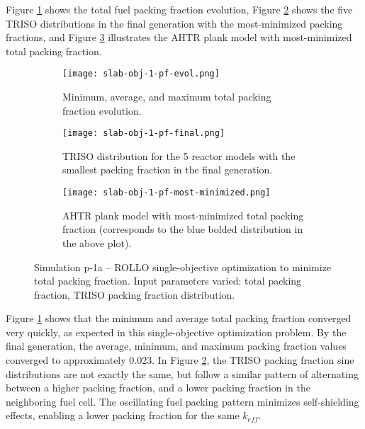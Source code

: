 Figure \ref{fig:slab-obj-1-pf-evol} shows the total fuel packing fraction evolution,  
Figure \ref{fig:slab-obj-1-pf-final} shows the five TRISO distributions in 
the final generation with the most-minimized packing fractions, and 
Figure \ref{fig:slab-obj-1-pf-most-minimized} illustrates the \gls{AHTR} plank model 
with most-minimized total packing fraction.
\begin{figure}[htbp!]
    \centering
    \begin{subfigure}{0.95\textwidth}
        \texttt{[image: slab-obj-1-pf-evol.png]}
        \caption{Minimum, average, and maximum total packing fraction evolution.}
        \label{fig:slab-obj-1-pf-evol} 
    \end{subfigure}
    \begin{subfigure}{0.95\textwidth}
        \texttt{[image: slab-obj-1-pf-final.png]}
        \caption{TRISO distribution for the 5 reactor models with the 
        smallest packing fraction in the final generation.}
        \label{fig:slab-obj-1-pf-final} 
    \end{subfigure}
    \begin{subfigure}{0.95\textwidth}
        \texttt{[image: slab-obj-1-pf-most-minimized.png]}
        \caption{\gls{AHTR} plank model with most-minimized total packing fraction 
        (corresponds to the blue bolded distribution in the above plot).}
        \label{fig:slab-obj-1-pf-most-minimized} 
    \end{subfigure}
    \caption{Simulation p-1a -- ROLLO single-objective optimization to minimize total 
    packing fraction. Input parameters varied: total packing fraction, \gls{TRISO} 
    packing fraction distribution.}
    \label{fig:slab-obj-1-pf}
\end{figure}

Figure \ref{fig:slab-obj-1-pf-evol} shows that the minimum and average total packing 
fraction converged very quickly, as expected in this single-objective optimization 
problem.
By the final generation, the average, minimum, and maximum packing fraction
values converged to approximately 0.023. 
In Figure \ref{fig:slab-obj-1-pf-final}, the \gls{TRISO} packing fraction
sine distributions are not exactly the same, but follow a similar pattern of 
alternating between a higher packing fraction, and a lower packing fraction 
in the neighboring fuel cell. 
The oscillating fuel packing pattern minimizes self-shielding effects, enabling  
a lower packing fraction for the same $k_{eff}$. 

